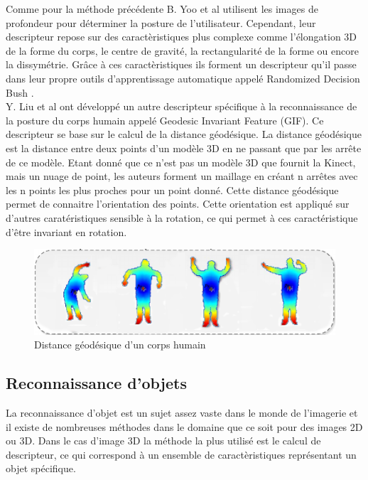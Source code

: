 Comme pour la méthode précédente B. Yoo et al\cite{RDB} utilisent les images de profondeur pour déterminer
la posture de l'utilisateur. Cependant, leur descripteur repose sur des caractèristiques plus complexe comme
l'élongation 3D de la forme du corps, le centre de gravité, la rectangularité de la forme ou encore la 
dissymétrie. Grâce à ces caractèristiques ils forment un descripteur qu'il passe dans leur propre outils
d'apprentissage automatique appelé \og Randomized Decision Bush \fg.\\

Y. Liu et al\cite{GIF} ont développé un autre descripteur spécifique à la reconnaissance de la posture du corps
humain appelé \og Geodesic Invariant Feature \fg(GIF). 
Ce descripteur se base sur le calcul de la distance géodésique. La distance géodésique est la distance
entre deux points d'un modèle 3D en ne passant que par les arrête de ce modèle. Etant donné que ce n'est pas un
modèle 3D que fournit la Kinect, mais un nuage de point, les auteurs forment un maillage en créant n arrêtes avec
les n points les plus proches pour un point donné. Cette distance géodésique permet de connaitre l'orientation
des points. Cette orientation est appliqué sur d'autres caratéristiques sensible à la rotation, ce qui permet
à ces caractéristique d'être invariant en rotation. 

\begin{figure}[!ht]
  \begin{center}
    \includegraphics[width=12cm]{image/geodesic.png}
    \caption{Distance géodésique d'un corps humain}
  \end{center}
\end{figure}

\subsection{Reconnaissance d'objets}
La reconnaissance d'objet est un sujet assez vaste dans le monde de l'imagerie et il existe de nombreuses
méthodes dans le domaine que ce soit pour des images 2D ou 3D. Dans le cas d'image 3D la méthode la plus utilisé
est le calcul de descripteur, ce qui correspond à un ensemble de caractèristiques représentant un objet spécifique.

